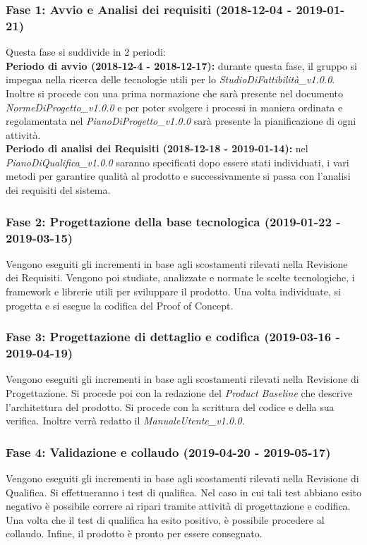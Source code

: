 \subsubsection{Fase 1: Avvio e Analisi dei requisiti (2018-12-04 - 2019-01-21)} 
Questa fase si suddivide in 2 periodi: \\
\textbf{Periodo di avvio (2018-12-4 - 2018-12-17):} 
durante questa fase, il gruppo si impegna nella ricerca delle tecnologie utili per lo \textit{StudioDiFattibilità\_v1.0.0}. Inoltre si procede con una prima normazione che sarà presente nel documento \textit{NormeDiProgetto\_v1.0.0} e per poter svolgere i processi in maniera ordinata e regolamentata nel \textit{PianoDiProgetto\_v1.0.0} sarà presente la pianificazione di ogni attività.\\
\textbf{Periodo di analisi dei Requisiti (2018-12-18 - 2019-01-14):} nel \textit{PianoDiQualifica\_v1.0.0} saranno specificati dopo essere stati individuati, i vari metodi per garantire qualità al prodotto e successivamente si passa con l'analisi dei requisiti del sistema.

\subsubsection{Fase 2: Progettazione della base tecnologica (2019-01-22 - 2019-03-15)}
Vengono eseguiti gli incrementi in base agli scostamenti rilevati nella Revisione dei Requisiti.
Vengono poi studiate, analizzate e normate le scelte tecnologiche, i framework e librerie utili per sviluppare il prodotto. Una volta individuate, si progetta e si esegue la codifica del Proof of Concept.\\

\subsubsection{Fase 3: Progettazione di dettaglio e codifica (2019-03-16 - 2019-04-19)}
Vengono eseguiti gli incrementi in base agli scostamenti rilevati nella Revisione di Progettazione.
Si procede poi con la redazione del \textit{Product Baseline} che descrive l'architettura del prodotto.
Si procede con la scrittura del codice e della sua verifica.
Inoltre verrà redatto il \textit{ManualeUtente\_v1.0.0}.\\

\subsubsection{Fase 4: Validazione e collaudo (2019-04-20 - 2019-05-17)}
Vengono eseguiti gli incrementi in base agli scostamenti rilevati nella Revisione di Qualifica.
Si effettueranno i test di qualifica. Nel caso in cui tali test abbiano esito negativo è possibile correre ai ripari tramite attività di progettazione e codifica. Una volta che il test di qualifica ha esito positivo, è possibile procedere al collaudo.
Infine, il prodotto è pronto per essere consegnato.

